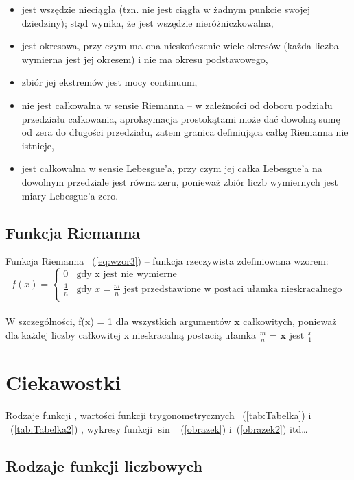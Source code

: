 \documentclass[a4paper]{article}
\begin{document}
\begin{itemize}
\item jest wszędzie nieciągła (tzn. nie jest ciągła w żadnym punkcie swojej dziedziny); stąd wynika, że jest wszędzie nieróżniczkowalna,
\item jest okresowa, przy czym ma ona nieskończenie wiele okresów (każda liczba wymierna jest jej okresem) i nie ma okresu podstawowego,
\item zbiór jej ekstremów jest mocy continuum,
\item nie jest całkowalna w sensie Riemanna – w zależności od doboru podziału przedziału całkowania, aproksymacja prostokątami może dać dowolną sumę od zera do długości przedziału, zatem granica definiująca całkę Riemanna nie istnieje,
\item jest całkowalna w sensie Lebesgue'a, przy czym jej całka Lebesgue'a na dowolnym przedziale jest równa zeru, ponieważ zbiór liczb wymiernych jest miary Lebesgue'a zero.
\end{itemize}

\subsection{Funkcja Riemanna}

Funkcja Riemanna ~(\ref{eq:wzor3}) – funkcja rzeczywista zdefiniowana wzorem:\\
\begin{equation}
\label{eq:wzor3}
f(x)=\begin{cases}
0 & \textrm{gdy x jest nie wymierne} \\ 
 \frac{1}{n} & \textrm{gdy } x=\frac{m}{n} \text{ jest przedstawione w postaci ułamka nieskracalnego}  \\
\end{cases}
\end{equation}\\
W szczególności, f(x) = 1 dla wszystkich argumentów $\mathbf{x}$ całkowitych, ponieważ dla każdej liczby całkowitej x nieskracalną postacią ułamka $\frac{m}{n}$ = $\mathbf{x}$ jest $\frac{x}{1}$

\section{Ciekawostki}
Rodzaje funkcji , wartości funkcji trygonometrycznych ~(\ref{tab:Tabelka}) i ~(\ref{tab:Tabelka2}) , wykresy funkcji $\sin$ ~(\ref{obrazek}) i~(\ref{obrazek2}) itd\dots


\subsection{Rodzaje funkcji liczbowych}
\end{document}
